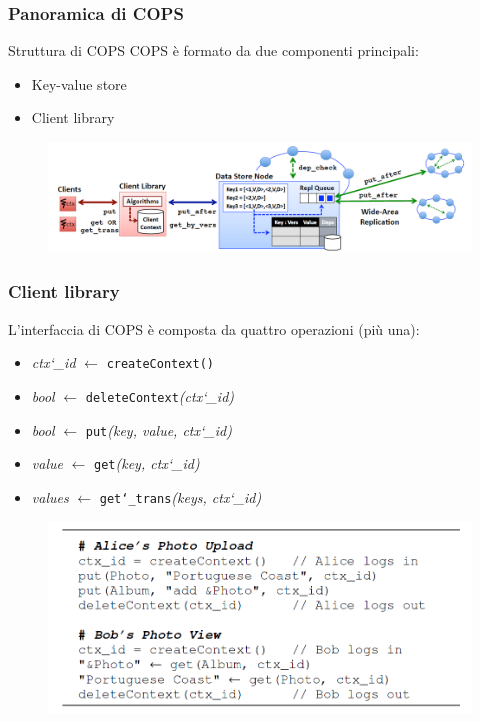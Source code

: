 \begin{frame}
\frametitle{Panoramica di COPS}
\begin{block}{Struttura di COPS}
COPS è formato da due componenti principali:
\begin{itemize}
	\item<1-> Key-value store
	\item<2-> Client library
\end{itemize}
\end{block}
\begin{figure}
	\centering
	\includegraphics[scale=0.35]{COPS/COPS7.png}
\end{figure}
\end{frame}

\begin{frame}
\frametitle{Client library}
L'interfaccia di COPS è composta da quattro operazioni (più una):
\begin{itemize}
	\item<1-> \textit{ctx\char`_id} $\leftarrow$ \texttt{createContext()}
	\item<2-> \textit{bool} $\leftarrow$ \texttt{deleteContext}\textit{(ctx\char`_id)}
	\item<3-> \textit{bool} $\leftarrow$ \texttt{put}\textit{(key, value, ctx\char`_id)}
	\item<4-> \textit{value} $\leftarrow$ \texttt{get}\textit{(key, ctx\char`_id)}
	\item<5-> \textit{values} $\leftarrow$ \texttt{get\char`_trans}\textit{(keys, ctx\char`_id)}
\end{itemize}
\begin{figure}
	\centering
	\includegraphics[scale=0.35]{COPS/COPS3.png}
\end{figure}
\end{frame}


